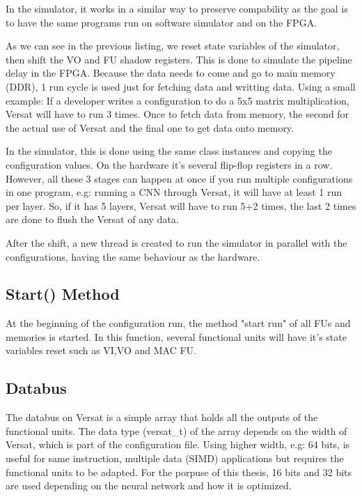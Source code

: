 In the simulator, it works in a similar way to preserve compability 
as the goal is to have the same
programs run on software simulator and on the FPGA.



As we can see in the previous listing, we reset state variables of the simulator, then shift the 
VO and FU shadow registers.
This is done to simulate the pipeline delay in the FPGA. 
Because the data needs to come and go to main memory (DDR),
1 run cycle is used just for fetching data and writting data. 
Using a small example:
If a developer writes a configuration to do a 5x5 matrix multiplication, 
Versat will have to run 3 times.
Once to fetch data from memory, the second for the actual use of Versat 
and the final one to get data onto memory.

In the simulator, this is done using the same class instances and 
copying the configuration values. On the hardware it's several flip-flop registers in a row.
However, all these 3 stages can happen at once if you run multiple configurations in one program, 
e.g: running a CNN
through Versat, it will have at least 1 run per layer. 
So, if it has 5 layers, Versat will have to run 5+2 times, the last 2 times are done to
flush the Versat of any data.

After the shift, a new thread is created to run the simulator in parallel 
with the configurations,
having the same behaviour as the hardware.

\subsection{Start() Method}

At the beginning of the configuration run, the method "start run" of 
all FUs and memories is started.
In this function, several functional units will have it's state variables 
reset such as VI,VO and MAC FU.

\subsection{Databus}

The databus on Versat is a simple array that holds all the outputs of the functional units.
The data type (versat\_t) of the array depends on the width of Versat, which is part of the configuration file.
Using higher width, e.g: 64 bits, is useful for same instruction, multiple data (SIMD) 
applications but requires the functional units to be adapted.
For the porpuse of this thesis, 16 bits and 32 bits are used depending 
on the neural network and how it is optimized.

